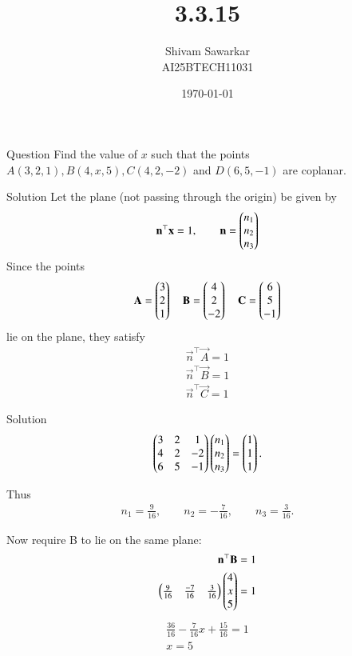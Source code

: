 \documentclass{beamer}
\title %
{3.3.15}
\date{\today}
\author %
{Shivam Sawarkar \\ AI25BTECH11031}
\begin{document}
\frame{\titlepage}
\begin{frame}{Question}
    Find the value of $x$ such that the points $A (3, 2, 1) , B (4, x, 5) , C (4, 2, -2)$ and $D (6, 5, -1)$ are coplanar.
\end{frame}

\begin{frame}{Solution}
    Let the plane (not passing through the origin) be given by
\begin{align}
\mathbf{n}^\top\mathbf{x}=1,\qquad 
\mathbf{n}=\begin{pmatrix}n_1 \\ n_2 \\ n_3\end{pmatrix}
\end{align}
Since the points 
\begin{align}
    \mathbf{A}=\begin{pmatrix}3 \\ 2 \\ 1\end{pmatrix} \quad
    \mathbf{B}=\begin{pmatrix}4 \\ 2 \\ -2\end{pmatrix} \quad
    \mathbf{C}=\begin{pmatrix}6 \\ 5 \\ -1\end{pmatrix}
\end{align}
lie on the plane, they satisfy 
\begin{align}
    \vec{n}^\top\vec{A}=1 \\ 
    \vec{n}^\top\vec{B}=1 \\ 
    \vec{n}^\top\vec{C}=1
\end{align}
\end{frame}

\begin{frame}{Solution}
    \begin{align}
\begin{pmatrix}
3 & 2 & 1\\ 
4 & 2 & -2\\ 
6 & 5 & -1
\end{pmatrix}
\begin{pmatrix}n_1\\ n_2\\ n_3\end{pmatrix}
=
\begin{pmatrix}1 \\ 1 \\ 1\end{pmatrix}.
\end{align}

Thus
\begin{align}
n_1=\frac{9}{16},\qquad n_2=-\frac{7}{16},\qquad n_3=\frac{3}{16}.
\end{align}

Now require B to lie on the same plane:
\begin{align}
\mathbf{n}^\top\mathbf{B}=1 \\ 
\begin{pmatrix}\frac{9}{16} & \frac{-7}{16} & \frac{3}{16}\end{pmatrix}\begin{pmatrix}4 \\ x \\ 5\end{pmatrix}=1
\end{align}
\begin{align}
\frac{36}{16} - \frac{7}{16}x + \frac{15}{16} = 1 \\ 
x=5
\end{align}
\end{frame}
\end{document}
